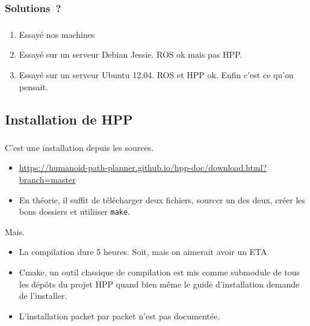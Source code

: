 \documentclass[11pt]{beamer}
\begin{document}
\subsubsection{Solutions~?}

\begin{frame}
    \frametitle{\subsecname}
    \begin{enumerate}
        \item Essayé nos machines
        \item Essayé sur un serveur Debian Jessie. ROS ok mais pas HPP\@.
        \item Essayé sur un serveur Ubuntu 12.04. ROS et HPP ok. Enfin c'est ce
            qu'on pensait.
    \end{enumerate}
\end{frame}

\subsection{Installation de HPP}

\begin{frame}[fragile]
    \frametitle{\subsecname}
    \begin{block}{C'est une installation depuis les sources.}
    \begin{itemize}
        \item \url{https://humanoid-path-planner.github.io/hpp-doc/download.html?branch=master}
        \item En théorie, il suffit de télécharger deux fichiers, sourcer un
            des deux, créer les bons dossiers et utiliiser \verb|make|.
    \end{itemize}
    \end{block}
    \begin{alertblock}{Mais.}
        \begin{itemize}
            \item La compilation dure 5 heures. Soit, mais on aimerait avoir un
                ETA.
            \item Cmake, un outil classique de compilation est mis comme
                submodule de tous les dépôts du projet HPP quand bien même le
                guide d'installation demande de l'installer.
            \item L'installation packet par packet n'est pas documentée.
        \end{itemize}
    \end{alertblock}
\end{frame}
\end{document}
